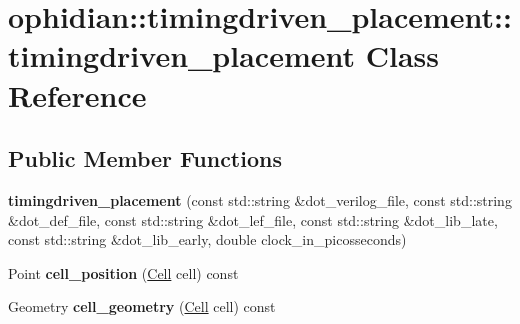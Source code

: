 \hypertarget{classophidian_1_1timingdriven__placement_1_1timingdriven__placement}{\section{ophidian\-:\-:timingdriven\-\_\-placement\-:\-:timingdriven\-\_\-placement Class Reference}
\label{classophidian_1_1timingdriven__placement_1_1timingdriven__placement}
}
\subsection*{Public Member Functions}
\begin{DoxyCompactItemize}
\item 
\hypertarget{classophidian_1_1timingdriven__placement_1_1timingdriven__placement_adc48b1b9f58578b40d76a6185065bd23}{{\bfseries timingdriven\-\_\-placement} (const std\-::string \&dot\-\_\-verilog\-\_\-file, const std\-::string \&dot\-\_\-def\-\_\-file, const std\-::string \&dot\-\_\-lef\-\_\-file, const std\-::string \&dot\-\_\-lib\-\_\-late, const std\-::string \&dot\-\_\-lib\-\_\-early, double clock\-\_\-in\-\_\-picosseconds)}\label{classophidian_1_1timingdriven__placement_1_1timingdriven__placement_adc48b1b9f58578b40d76a6185065bd23}

\item 
\hypertarget{classophidian_1_1timingdriven__placement_1_1timingdriven__placement_aa5ccf07957d6dfe4fe0ed94fe16880b4}{Point {\bfseries cell\-\_\-position} (\hyperlink{classophidian_1_1entity_1_1entity}{Cell} cell) const }\label{classophidian_1_1timingdriven__placement_1_1timingdriven__placement_aa5ccf07957d6dfe4fe0ed94fe16880b4}

\item 
\hypertarget{classophidian_1_1timingdriven__placement_1_1timingdriven__placement_a7a73d743dde7e2c79271a81649fb9402}{Geometry {\bfseries cell\-\_\-geometry} (\hyperlink{classophidian_1_1entity_1_1entity}{Cell} cell) const }\label{classophidian_1_1timingdriven__placement_1_1timingdriven__placement_a7a73d743dde7e2c79271a81649fb9402}


\end{DoxyCompactItemize}
